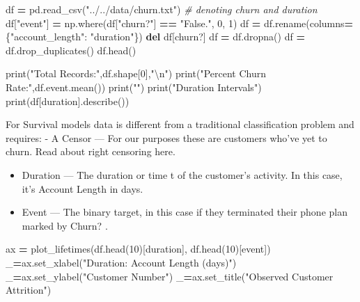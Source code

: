 \documentclass[
]{book}
\newenvironment{Shaded}{\begin{snugshade}}{\end{snugshade}}
\newcommand{\BuiltInTok}[1]{#1}
\newcommand{\CharTok}[1]{\textcolor[rgb]{0.31,0.60,0.02}{#1}}
\newcommand{\CommentTok}[1]{\textcolor[rgb]{0.56,0.35,0.01}{\textit{#1}}}
\newcommand{\DecValTok}[1]{\textcolor[rgb]{0.00,0.00,0.81}{#1}}
\newcommand{\KeywordTok}[1]{\textcolor[rgb]{0.13,0.29,0.53}{\textbf{#1}}}
\newcommand{\NormalTok}[1]{#1}
\newcommand{\OperatorTok}[1]{\textcolor[rgb]{0.81,0.36,0.00}{\textbf{#1}}}
\newcommand{\StringTok}[1]{\textcolor[rgb]{0.31,0.60,0.02}{#1}}
\begin{document}
\begin{Shaded}
\begin{Highlighting}[]
\NormalTok{df }\OperatorTok{=}\NormalTok{ pd.read\_csv(}\StringTok{"../../data/churn.txt"}\NormalTok{)}
\CommentTok{\# denoting churn and duration}
\NormalTok{df[}\StringTok{"event"}\NormalTok{] }\OperatorTok{=}\NormalTok{ np.where(df[}\StringTok{"churn?"}\NormalTok{] }\OperatorTok{==} \StringTok{"False."}\NormalTok{, }\DecValTok{0}\NormalTok{, }\DecValTok{1}\NormalTok{) }
\NormalTok{df }\OperatorTok{=}\NormalTok{ df.rename(columns}\OperatorTok{=}\NormalTok{\{}\StringTok{"account\_length"}\NormalTok{: }\StringTok{"duration"}\NormalTok{\})}
\KeywordTok{del}\NormalTok{ df[}\StringTok{\textquotesingle{}churn?\textquotesingle{}}\NormalTok{]}
\NormalTok{df }\OperatorTok{=}\NormalTok{ df.dropna()}
\NormalTok{df }\OperatorTok{=}\NormalTok{ df.drop\_duplicates()}
\NormalTok{df.head()}
\end{Highlighting}
\end{Shaded}

\begin{Shaded}
\begin{Highlighting}[]
\BuiltInTok{print}\NormalTok{(}\StringTok{"Total Records:"}\NormalTok{,df.shape[}\DecValTok{0}\NormalTok{],}\StringTok{"}\CharTok{\textbackslash{}n}\StringTok{"}\NormalTok{)}
\BuiltInTok{print}\NormalTok{(}\StringTok{"Percent Churn Rate:"}\NormalTok{,df.event.mean())}
\BuiltInTok{print}\NormalTok{(}\StringTok{""}\NormalTok{)}
\BuiltInTok{print}\NormalTok{(}\StringTok{"Duration Intervals"}\NormalTok{)}
\BuiltInTok{print}\NormalTok{(df[}\StringTok{\textquotesingle{}duration\textquotesingle{}}\NormalTok{].describe())}
\end{Highlighting}
\end{Shaded}

For Survival models data is different from a traditional classification problem and requires:
- A Censor --- For our purposes these are customers who've yet to churn. Read about right censoring here.

\begin{itemize}
\item
  Duration --- The duration or time t of the customer's activity. In this case, it's Account Length in days.
\item
  Event --- The binary target, in this case if they terminated their phone plan marked by Churn? .
\end{itemize}

\begin{Shaded}
\begin{Highlighting}[]
\NormalTok{ax }\OperatorTok{=}\NormalTok{ plot\_lifetimes(df.head(}\DecValTok{10}\NormalTok{)[}\StringTok{\textquotesingle{}duration\textquotesingle{}}\NormalTok{], df.head(}\DecValTok{10}\NormalTok{)[}\StringTok{\textquotesingle{}event\textquotesingle{}}\NormalTok{])}
\NormalTok{\_}\OperatorTok{=}\NormalTok{ax.set\_xlabel(}\StringTok{"Duration: Account Length (days)"}\NormalTok{) \_}\OperatorTok{=}\NormalTok{ax.set\_ylabel(}\StringTok{"Customer Number"}\NormalTok{) \_}\OperatorTok{=}\NormalTok{ax.set\_title(}\StringTok{"Observed Customer Attrition"}\NormalTok{)}
\end{Highlighting}
\end{Shaded}
\end{document}
